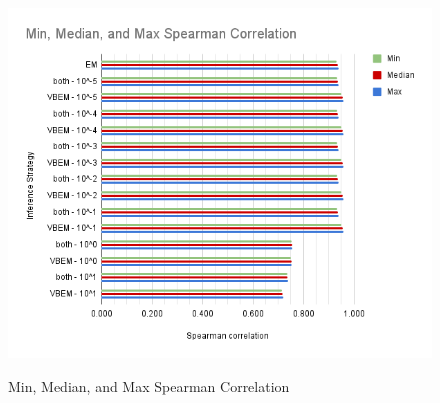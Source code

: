   \begin{figure}[!t]%
    \centering
    {\includegraphics[width=\textwidth]{Min, Median, and Max Spearman Correlation.png}}
    \caption{Min, Median, and Max Spearman Correlation}\label{spearfig}
    \end{figure}

